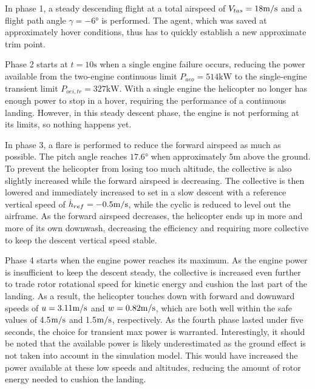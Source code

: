 In phase 1, a steady descending flight at a total airspeed of $V_{tas}=18\si[per-mode=symbol]{\meter \per \second}$ and a flight path angle $\gamma = -6\si{\degree}$ is performed. The agent, which was saved at approximately hover conditions, thus has to quickly establish a new approximate trim point. 

Phase 2 starts at $t=10\si{\second}$ when a single engine failure occurs, reducing the power available from the two-engine continuous limit $P_{aeo} = 514\si{\kilo\watt}$ to the single-engine transient limit $P_{oei,tr}=327\si{\kilo\watt}$. With a single engine the helicopter no longer has enough power to stop in a hover, requiring the performance of a continuous landing. However, in this steady descent phase, the engine is not performing at its limits, so nothing happens yet.

In phase 3, a flare is performed to reduce the forward airspeed as much as possible. The pitch angle reaches $17.6\si{\degree}$ when approximately $5\si{\meter}$ above the ground. To prevent the helicopter from losing too much altitude, the collective is also slightly increased while the forward airspeed is decreasing. The collective is then lowered and immediately increased to set in a slow descent with a reference vertical speed of $\dot{h}_{ref}=-0.5\si[per-mode=symbol]{\meter \per \second}$, while the cyclic is reduced to level out the airframe. As the forward airspeed decreases, the helicopter ends up in more and more of its own downwash, decreasing the efficiency and requiring more collective to keep the descent vertical speed stable. 

Phase 4 starts when the engine power reaches its maximum. As the engine power is insufficient to keep the descent steady, the collective is increased even further to trade rotor rotational speed for kinetic energy and cushion the last part of the landing. As a result, the helicopter touches down with forward and downward speeds of $u=3.11\si[per-mode=symbol]{\meter \per \second}$ and $w=0.82\si[per-mode=symbol]{\meter \per \second}$, which are both well within the safe values of 4.5$\si[per-mode=symbol]{\meter \per \second}$ and 1.5$\si[per-mode=symbol]{\meter \per \second}$, respectively. As the fourth phase lasted under five seconds, the choice for transient max power is warranted. Interestingly, it should be noted that the available power is likely underestimated as the ground effect is not taken into account in the simulation model. This would have increased the power available at these low speeds and altitudes, reducing the amount of rotor energy needed to cushion the landing. 

